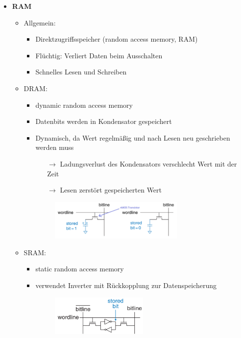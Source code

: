 \documentclass[11pt,a4paper]{article}
\begin{document}
\begin{itemize}
\item \textbf{RAM}
	\begin{itemize}
	\item Allgemein:
		\begin{itemize}
		\item Direktzugriffsspeicher (random access memory, RAM)
		\item Flüchtig: Verliert Daten beim Ausschalten
		\item Schnelles Lesen und Schreiben
		\end{itemize}
	\item DRAM:
		\begin{itemize}
		\item dynamic random access memory
		\item Datenbits werden in Kondensator gespeichert
		\item Dynamisch, da Wert regelmäßig und nach Lesen neu geschrieben werden muss
			\begin{itemize}
			\item[$\rightarrow$] Ladungsverlust des Kondensators verschlecht Wert mit der Zeit
			\item[$\rightarrow$] Lesen zerstört gespeicherten Wert
			\end{itemize}
		\item[]
			\begin{figure}[H]
			\begin{center}
			\includegraphics[height=2cm]{Bilder/dram}
			\end{center}
			\end{figure}
		\end{itemize}
		
	\item SRAM:
		\begin{itemize}
		\item static random access memory
		\item verwendet Inverter mit Rückkopplung zur Datenspeicherung
		\item[]
			\begin{figure}[H]
			\begin{center}
			\includegraphics[height=2cm]{Bilder/sram}
			\end{center}
			\end{figure}
		\end{itemize}
	\end{itemize}
	

\end{itemize}
\end{document}
